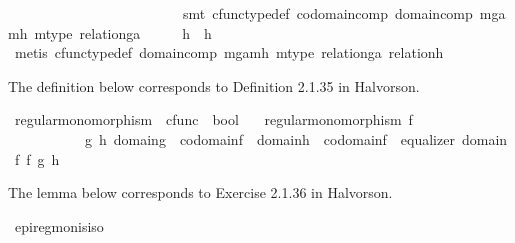 \begin{isabellebody}
\ \ \ \ \ \ \ \ \ \ \ \ \ \ \ \ \ \ \ \ \ \ \ \ \ smt\ cfunc{\isacharunderscore}{\kern0pt}type{\isacharunderscore}{\kern0pt}def\ codomain{\isacharunderscore}{\kern0pt}comp\ domain{\isacharunderscore}{\kern0pt}comp\ m{\isacharunderscore}{\kern0pt}ga{\isacharunderscore}{\kern0pt}mh\ m{\isacharunderscore}{\kern0pt}type\ relation{\isacharunderscore}{\kern0pt}ga{\isacharparenright}{\kern0pt}\isanewline
\ \ \isamarkupfalse%
\ \isamarkupfalse%
\ {\isachardoublequoteopen}h{}\ {\isacharequal}{\kern0pt}\ h{}{\isachardoublequoteclose}\isanewline
\ \ \ \ \isamarkupfalse%
\ {\isacharparenleft}{\kern0pt}metis\ cfunc{\isacharunderscore}{\kern0pt}type{\isacharunderscore}{\kern0pt}def\ domain{\isacharunderscore}{\kern0pt}comp\ m{\isacharunderscore}{\kern0pt}ga{\isacharunderscore}{\kern0pt}mh\ m{\isacharunderscore}{\kern0pt}type\ relation{\isacharunderscore}{\kern0pt}ga\ relation{\isacharunderscore}{\kern0pt}h{\isacharparenright}{\kern0pt}\isanewline
{}\isamarkupfalse%
%
\endisatagproof
{\isafoldproof}%
%
\isadelimproof
%
\endisadelimproof
%
\begin{isamarkuptext}%
The definition below corresponds to Definition 2.1.35 in Halvorson.%
\end{isamarkuptext}\isamarkuptrue%
\isamarkupfalse%
\ regular{\isacharunderscore}{\kern0pt}monomorphism\ {\isacharcolon}{\kern0pt}{\isacharcolon}{\kern0pt}\ {\isachardoublequoteopen}cfunc\ {\isasymRightarrow}\ bool{\isachardoublequoteclose}\isanewline
\ \ \ {\isachardoublequoteopen}regular{\isacharunderscore}{\kern0pt}monomorphism\ f\ \ {\isasymlongleftrightarrow}\ \ \isanewline
\ \ \ \ \ \ \ \ \ \ {\isacharparenleft}{\kern0pt}{\isasymexists}\ g\ h{\isachardot}{\kern0pt}\ domain{\isacharparenleft}{\kern0pt}g{\isacharparenright}{\kern0pt}\ {\isacharequal}{\kern0pt}\ codomain{\isacharparenleft}{\kern0pt}f{\isacharparenright}{\kern0pt}\ {\isasymand}\ domain{\isacharparenleft}{\kern0pt}h{\isacharparenright}{\kern0pt}\ {\isacharequal}{\kern0pt}\ codomain{\isacharparenleft}{\kern0pt}f{\isacharparenright}{\kern0pt}\ {\isasymand}\ equalizer\ {\isacharparenleft}{\kern0pt}domain\ f{\isacharparenright}{\kern0pt}\ f\ g\ h{\isacharparenright}{\kern0pt}{\isachardoublequoteclose}%
\begin{isamarkuptext}%
The lemma below corresponds to Exercise 2.1.36 in Halvorson.%
\end{isamarkuptext}\isamarkuptrue%
\isamarkupfalse%
\ epi{\isacharunderscore}{\kern0pt}regmon{\isacharunderscore}{\kern0pt}is{\isacharunderscore}{\kern0pt}iso{\isacharcolon}{\kern0pt}\isanewline

\end{isabellebody}
